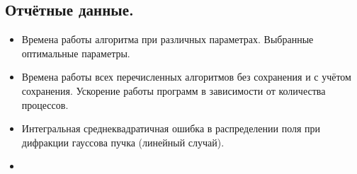 \subsection{Отчётные данные.}

\begin{itemize}
	\item Времена работы алгоритма {\fftw} при различных параметрах. Выбранные оптимальные параметры.
	\item Времена работы всех перечисленных алгоритмов без сохранения и с учётом сохранения. Ускорение работы программ в зависимости от количества процессов.
	\item Интегральная среднеквадратичная ошибка в распределении поля при дифракции гауссова пучка (линейный случай).
	\item {}
\end{itemize}

